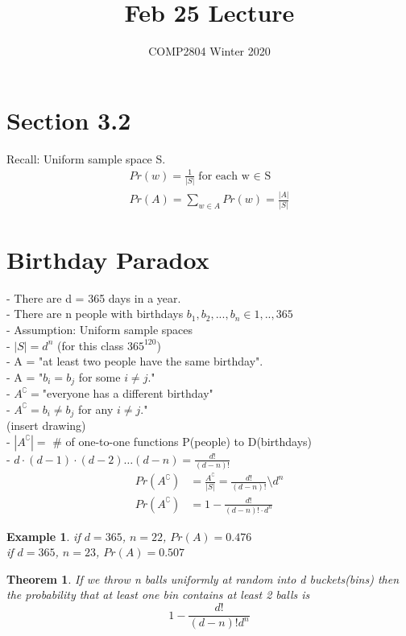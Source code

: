 \documentclass[a4paper,12pt]{article}
\title{Feb 25 Lecture}
\author{COMP2804 Winter 2020}
\newtheorem{theorem}{Theorem}
\newtheorem{example}{Example}
\begin{document}
\section{Section 3.2}
Recall: Uniform sample space S.
\begin{align*}
   Pr(w) = \frac{1}{|S|}  \text{for each w $\in$ S} \\
   Pr(A) = \sum_{w \in A}^{} Pr(w) = \frac{|A|}{|S|} 
\end{align*}
\section{Birthday Paradox}
  - There are d = 365 days in a year. \\
  - There are n people with birthdays $b_{1}, b_{2}, ..., b_{n} \in {1,..,365} $ \\
  - Assumption: Uniform sample spaces \\
  - $|S| = d^{n}$ (for this class $365^{120}$) \\
  - A = "at least two people have the same birthday". \\
  - A = "$b_{i} = b_{j}$ for some $i \neq j$." \\
  - $A^\complement = $"everyone has a different birthday" \\ 
  - $A^\complement = b_{i} \neq b_{j}$ for any $i \neq j$." \\
(insert drawing)\\
  - $|A^\complement| = $ \# of one-to-one functions P(people) to D(birthdays) \\ 
  - $d\cdot(d-1)\cdot(d-2) \ldots (d-n) = \frac{d!}{(d-n)!}$
\begin{align*}
    Pr(A^\complement) &= \frac{A^\complement}{|S|} = \frac{d!}{(d-n)!} \setminus d^{n}\\
    Pr(A^\complement) &= 1 - \frac{d!}{(d-n)!\cdot d^{n}} 
\end{align*}
\begin{example} 
  if $d=365$, $n=22$, $Pr(A) = 0.476$ \\ 
  if $d=365$, $n=23$, $Pr(A) = 0.507$ 
\end{example}

\begin{theorem}
  If we throw n balls uniformly at random into d buckets(bins) then the 
  probability that at least one bin contains at least 2 balls is $$1 - \frac{d!}{(d-n)!d^{n}}$$
\end{theorem}
\end{document}
